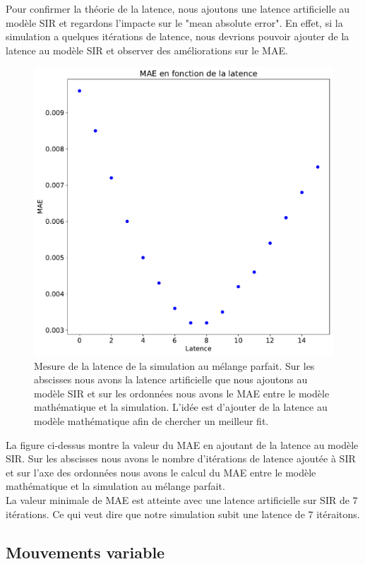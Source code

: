 Pour confirmer la théorie de la latence, nous ajoutons une latence artificielle au modèle SIR et regardons l'impacte sur le "mean absolute error". En effet, si la simulation a quelques itérations de latence, nous devrions pouvoir ajouter de la latence au modèle SIR et observer des améliorations sur le MAE.

\newpage

\begin{figure}[h]
    \centering
	\captionsetup{justification=centering}
	\includegraphics[width=.7\textwidth]{Images/SIR_latence_8_5.pdf}
	\caption[Mesures de latences SIR]{Mesure de la latence de la simulation au mélange parfait. Sur les abscisses nous avons la latence artificielle que nous ajoutons au modèle SIR et sur les ordonnées nous avons le MAE entre le modèle mathématique et la simulation. L'idée est d'ajouter de la latence au modèle mathématique afin de chercher un meilleur fit.}
\end{figure}

La figure ci-dessus montre la valeur du MAE en ajoutant de la latence au modèle SIR. Sur les abscisses nous avons le nombre d'itérations de latence ajoutée à SIR et sur l'axe des ordonnées nous avons le calcul du MAE entre le modèle mathématique et la simulation au mélange parfait.\\

La valeur minimale de MAE est atteinte avec une latence artificielle sur SIR de $7$ itérations. Ce qui veut dire que notre simulation subit une latence de $7$ itéraitons.

\newpage

\subsection{Mouvements variable}

